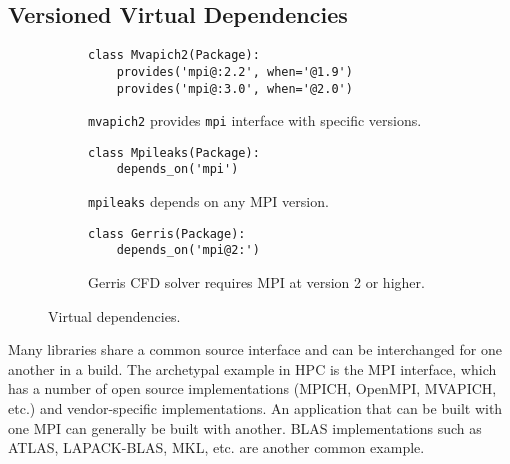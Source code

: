 
\subsection{Versioned Virtual Dependencies}\label{sec:virtual}

\begin{figure}
%
\begin{subfigure}{\linewidth}
	\begin{verbatim}
class Mvapich2(Package):    
    provides('mpi@:2.2', when='@1.9')
    provides('mpi@:3.0', when='@2.0')
\end{verbatim}
	\caption{%
		{\tt mvapich2} provides {\tt mpi} interface with specific versions.
		\label{fig:virtual-deps-provides}
	}
\end{subfigure}
%
\begin{subfigure}{\linewidth}
	\begin{verbatim}
class Mpileaks(Package):    
    depends_on('mpi')
\end{verbatim}
	\caption{%
		{\tt mpileaks} depends on any MPI version.
		\label{fig:virtual-deps-mpileaks}
	}
\end{subfigure}
%
\begin{subfigure}{\linewidth}
	\begin{verbatim}
class Gerris(Package):
    depends_on('mpi@2:')
\end{verbatim}
	\caption{%
		Gerris CFD solver requires MPI at version 2 or higher.
		\label{fig:virtual-deps-depends}
	}
\end{subfigure}
%
\caption{
	Virtual dependencies.
	\label{fig:virtual-deps}
}
\end{figure}

Many libraries share a common source interface and can be interchanged for
one another in a build.
The archetypal example in HPC is the MPI interface, which has a number of
open source implementations (MPICH, OpenMPI, MVAPICH, etc.) and vendor-specific
implementations. An application that can be built with one MPI can generally be
built with another.  BLAS implementations such as ATLAS, LAPACK-BLAS, MKL, etc.
are another common example.

